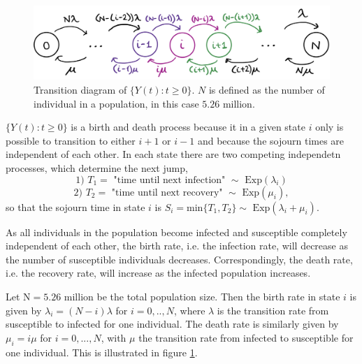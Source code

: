 \begin{figure}
    \centering
    \includegraphics[width=140mm]{1f_new.png}
    \caption{Transition diagram of $\{Y(t):t \geq 0 \}$. $N$ is defined as the number of individual in a population, in this case $5.26 \text{ million.}$}
    \label{transdiagramY}
\end{figure}
$\{Y(t):t \geq 0\}$ is a birth and death process because it in a given state $i$ only is possible to transition to either $i+1$ or $i-1$ and because the sojourn times are independent of each other. In each state there are two competing independetn processes, which determine the next jump,
$$\text{1) } T_1  = \text{ "time until next infection" } \sim \text{ Exp}(\lambda_i)$$
$$\text{2) } T_2 = \text{ "time until next recovery" } \sim \text{ Exp}(\mu_i),$$
so that the sojourn time in state $i$ is $S_i = \text{min}\{T_1, T_2\} \sim \text{ Exp}(\lambda_i +\mu_i)$.

As all individuals in the population become infected and susceptible completely independent of each other, the birth rate, i.e. the infection rate, will decrease as the number of susceptible individuals decreases. Correspondingly, the death rate, i.e. the recovery rate, will increase as the infected population increases. 

Let $\text{N}=5.26\text{ million}$ be the total population size. Then the birth rate in state $i$ is given by $\lambda_i=(N-i)\lambda$ for $i=0,..,N$, where $\lambda$ is the transition rate from susceptible to infected for one individual. The death rate is similarly given by $\mu_i = i\mu$ for $i=0,...,N$, with $\mu$ the transition rate from infected to susceptible for one individual. This is illustrated in figure \ref{transdiagramY}.

